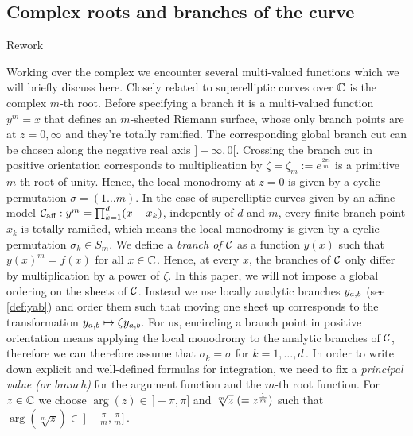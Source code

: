 \documentclass[main.tex]{subfiles}
\begin{document}
   

  
  \subsection{Complex roots and branches of the curve}\label{subsec:roots_branches}

 \todo Rework
  
  Working over the complex we encounter several multi-valued functions which we will briefly discuss here.  Closely related to superelliptic curves over $\mathbb{C}$ is the complex $m$-th root. Before specifying
  a branch it is a multi-valued function $y^m = x$ that defines an $m$-sheeted Riemann surface, whose only branch points are at $z = 0,\infty$ and they're totally ramified. The corresponding global
  branch cut can be chosen along the negative real axis $]\!-\infty,0[$. Crossing the branch cut in positive orientation corresponds to multiplication by $\zeta = \zeta_m
  := e^{\frac{2\pi i }{m}}$ is a primitive $m$-th root of unity. Hence, the local monodromy at $z = 0$ is given by a cyclic permutation $\sigma = (1 \dots m)$. \abstandl
 In the case of superelliptic curves given by an affine model $\mathcal{C}_{\text{aff}} : y^m = \prod_{k = 1}^d (x - x_k)$, indepently of $d$ and $m$, every finite branch point $x_k$ is totally ramified, which
 means the local monodromy is given by a cyclic permutation $\sigma_k \in S_m$. We define a 
 \emph{branch of $\mathcal{C}$} as a function
  $y(x)$ such that $y(x)^m = f(x)$ for all $x \in \mathbb{C}$. Hence, at every $x$, the branches of $\mathcal{C}$ only differ by multiplication by a power of $\zeta$. \abstandl
  In this paper, we will not impose a global ordering on the sheets of $\mathcal{C}$. Instead we use locally analytic branches $y_{a,b}$ (see \ref{def:yab}) and order them such that moving one sheet up corresponds to the
  transformation $y_{a,b} \mapsto \zeta y_{a,b}$. For us, encircling a branch point in positive orientation means applying 
  the local monodromy to the analytic branches of $\mathcal{C}$, therefore we can therefore assume that $\sigma_k = \sigma$ for $k = 1,\dots,d$\,. \abstandl
  In order to write down explicit and well-defined formulas for integration, we need to fix a \emph{principal value (or branch)} for the argument function and the $m$-th root function.
  For $z \in \mathbb{C}$ we choose $\arg(z) \in \,]\!\!-\pi,\pi]$ and $\sqrt[m]{z} \;( = z^{\frac{1}{m}} )$ such that $\arg(\sqrt[m]{z}) \in \, ]\!\!-\frac{\pi}{m},\frac{\pi}{m}]$\,. \abstandl



 
  
\end{document}
